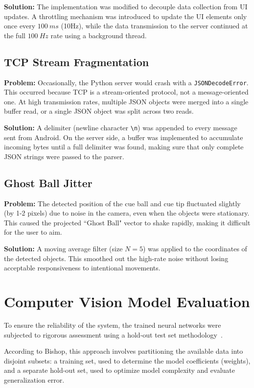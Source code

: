 \textbf{Solution:} The implementation was modified to decouple data collection from UI updates. A throttling mechanism was introduced to update the UI elements only once every $100~ms$ (10Hz), while the data transmission to the server continued at the full $100~Hz$ rate using a background thread.

\subsection{TCP Stream Fragmentation}
\textbf{Problem:} Occasionally, the Python server would crash with a \texttt{JSONDecodeError}. This occurred because TCP is a stream-oriented protocol, not a message-oriented one. At high transmission rates, multiple JSON objects were merged into a single buffer read, or a single JSON object was split across two reads.

\textbf{Solution:} A delimiter (newline character \texttt{\textbackslash n}) was appended to every message sent from Android. On the server side, a buffer was implemented to accumulate incoming bytes until a full delimiter was found, making sure that only complete JSON strings were passed to the parser.

\subsection{Ghost Ball Jitter}
\textbf{Problem:} The detected position of the cue ball and cue tip fluctuated slightly (by 1-2 pixels) due to noise in the camera, even when the objects were stationary. This caused the projected ``Ghost Ball" vector to shake rapidly, making it difficult for the user to aim.

\textbf{Solution:} A moving average filter (size $N=5$) was applied to the coordinates of the detected objects. This smoothed out the high-rate noise without losing acceptable responsiveness to intentional movements.

\section{Computer Vision Model Evaluation}
To ensure the reliability of the system, the trained neural networks were subjected to rigorous assessment using a hold-out test set methodology~\cite{bib:hold}. 

According to Bishop, this approach involves partitioning the available data into disjoint subsets: a training set, used to determine the model coefficients (weights), and a separate hold-out set, used to optimize model complexity and evaluate generalization error. 
